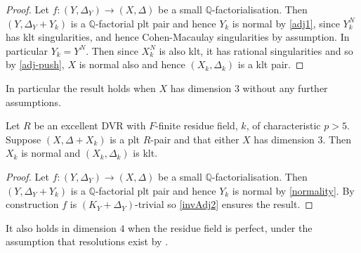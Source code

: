 \documentclass[a4paper,12pt]{book}
\begin{document}
\begin{proof}
	
	Let $f\colon (Y,\Delta_{Y})\to (X,\Delta)$ be a small $\mathbb{Q}$-factorialisation. Then $(Y,\Delta_{Y}+Y_{k})$ is a $\mathbb{Q}$-factorial plt pair and hence $Y_{k}$ is normal by \autoref{adj1}, since $Y_{k}^{N}$ has klt singularities, and hence Cohen-Macaulay singularities by assumption. In particular $Y_{k}=Y^{N}$. Then since $X_{k}^{N}$ is also klt, it has rational singularities and so by \autoref{adj-push}, $X$ is normal also and hence $(X_{k},\Delta_{k})$ is a klt pair.
	
\end{proof}

In particular the result holds when $X$ has dimension $3$ without any further assumptions.
 

\begin{corollary}\label{invAdj3}
	Let $R$ be an excellent DVR with $F$-finite residue field, $k$, of characteristic $p> 5$.	Suppose $(X,\Delta+X_{k})$ is a plt $R$-pair and that either $X$ has dimension $3$. Then $X_{k}$ is normal and $(X_{k}, \Delta_{k})$ is klt.
\end{corollary}

\begin{proof}
	Let $f\colon (Y,\Delta_{Y})\to (X,\Delta)$ be a small $\mathbb{Q}$-factorialisation. Then $(Y,\Delta_{Y}+Y_{k})$ is a $\mathbb{Q}$-factorial plt pair and hence $Y_{k}$ is normal by \autoref{normality}. By construction $f$ is $(K_{Y}+\Delta_{Y})$-trivial so \autoref{invAdj2} ensures the result.
\end{proof}

It also holds in dimension $4$ when the residue field is perfect, under the assumption that resolutions exist by \cite{}.





\end{document}
